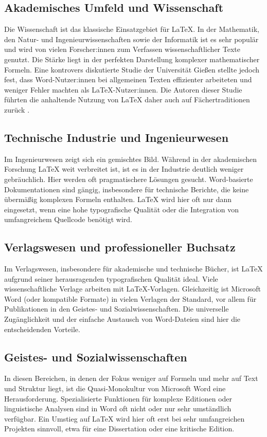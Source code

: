 \documentclass[a4paper,12pt]{article}
\begin{document}
	\subsection{Akademisches Umfeld und Wissenschaft}
	Die Wissenschaft ist das klassische Einsatzgebiet für \LaTeX. In der Mathematik, den Natur- und Ingenieurwissenschaften sowie der Informatik ist es sehr populär und wird von vielen Forscher:innen zum Verfassen wissenschaftlicher Texte genutzt. Die Stärke liegt in der perfekten Darstellung komplexer mathematischer Formeln. Eine kontrovers diskutierte Studie der Universität Gießen stellte jedoch fest, dass Word-Nutzer:innen bei allgemeinen Texten effizienter arbeiteten und weniger Fehler machten als \LaTeX-Nutzer:innen. Die Autoren dieser Studie führten die anhaltende Nutzung von \LaTeX{} daher auch auf Fächertraditionen zurück \cite{knauff-latex-studie}.
	
	\subsection{Technische Industrie und Ingenieurwesen}
	Im Ingenieurwesen zeigt sich ein gemischtes Bild. Während in der akademischen Forschung \LaTeX{} weit verbreitet ist, ist es in der Industrie deutlich weniger gebräuchlich. Hier werden oft pragmatischere Lösungen gesucht. Word-basierte Dokumentationen sind gängig, insbesondere für technische Berichte, die keine übermäßig komplexen Formeln enthalten. \LaTeX{} wird hier oft nur dann eingesetzt, wenn eine hohe typografische Qualität oder die Integration von umfangreichem Quellcode benötigt wird.
	
	\subsection{Verlagswesen und professioneller Buchsatz}
	Im Verlagswesen, insbesondere für akademische und technische Bücher, ist \LaTeX{} aufgrund seiner herausragenden typografischen Qualität ideal. Viele wissenschaftliche Verlage arbeiten mit \LaTeX-Vorlagen. Gleichzeitig ist Microsoft Word (oder kompatible Formate) in vielen Verlagen der Standard, vor allem für Publikationen in den Geistes- und Sozialwissenschaften. Die universelle Zugänglichkeit und der einfache Austausch von Word-Dateien sind hier die entscheidenden Vorteile.
	
	\subsection{Geistes- und Sozialwissenschaften}
	In diesen Bereichen, in denen der Fokus weniger auf Formeln und mehr auf Text und Struktur liegt, ist die Quasi-Monokultur von Microsoft Word eine Herausforderung. Spezialisierte Funktionen für komplexe Editionen oder linguistische Analysen sind in Word oft nicht oder nur sehr umständlich verfügbar. Ein Umstieg auf \LaTeX{} wird hier oft erst bei sehr umfangreichen Projekten sinnvoll, etwa für eine Dissertation oder eine kritische Edition.
	
\end{document}
